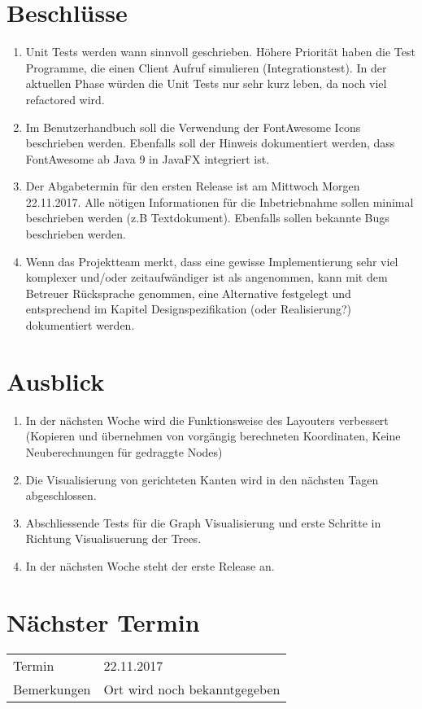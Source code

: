 \documentclass[11pt, a4paper,oneside]{scrartcl}
\begin{document}
\section{Beschlüsse}
\begin{enumerate}
	\item Unit Tests werden wann sinnvoll geschrieben. Höhere Priorität haben die Test Programme, die einen Client Aufruf simulieren (Integrationstest). In der aktuellen Phase würden die Unit Tests nur sehr kurz leben, da noch viel refactored wird.
	\item Im Benutzerhandbuch soll die Verwendung der FontAwesome Icons beschrieben werden. Ebenfalls soll der Hinweis dokumentiert werden, dass FontAwesome ab Java 9 in JavaFX integriert ist.
	\item Der Abgabetermin für den ersten Release ist am Mittwoch Morgen 22.11.2017. Alle nötigen Informationen für die Inbetriebnahme sollen minimal beschrieben werden (z.B Textdokument). Ebenfalls sollen bekannte Bugs beschrieben werden.
	\item Wenn das Projektteam merkt, dass eine gewisse Implementierung sehr viel komplexer und/oder zeitaufwändiger ist als angenommen, kann mit dem Betreuer Rücksprache genommen, eine Alternative festgelegt und entsprechend im Kapitel Designspezifikation (oder Realisierung?) dokumentiert werden.
\end{enumerate} 

\section{Ausblick}
\begin{enumerate}
	\item In der nächsten Woche wird die Funktionsweise des Layouters verbessert (Kopieren und übernehmen von vorgängig berechneten Koordinaten, Keine Neuberechnungen für gedraggte Nodes)
 	\item Die Visualisierung von gerichteten Kanten wird in den nächsten Tagen abgeschlossen.
 	\item Abschliessende Tests für die Graph Visualisierung und erste Schritte in Richtung Visualisuerung der Trees.
 	\item In der nächsten Woche steht der erste Release an.
\end{enumerate}

\section{Nächster Termin}
\begin{tabu} to \linewidth {l X }
	\toprule
	Termin & 22.11.2017  \\
	Bemerkungen & Ort wird noch bekanntgegeben   \\
	\bottomrule
\end{tabu}
\end{document}
